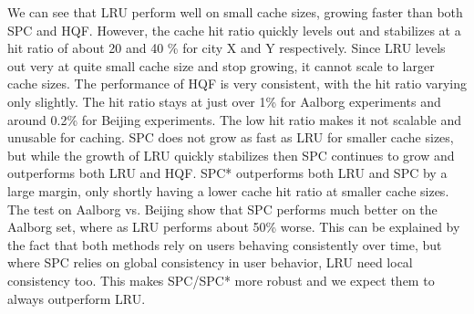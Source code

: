 
We can see that LRU perform well on small cache sizes, growing faster than both SPC and HQF. However, the cache hit ratio quickly levels out and stabilizes at a hit ratio of about 20 and 40 \% for city X and Y respectively. Since LRU levels out very at quite small cache size and stop growing, it cannot scale to larger cache sizes.
The performance of HQF is very consistent, with the hit ratio varying only slightly. The hit ratio stays at just over 1\% for Aalborg experiments and around 0.2\% for Beijing experiments. The low hit ratio makes it not scalable and unusable for \spath caching.
SPC does not grow as fast as LRU for smaller cache sizes, but while the growth of LRU quickly stabilizes then SPC continues to grow and outperforms both LRU and HQF.
SPC* outperforms both LRU and SPC by a large margin, only shortly having a lower cache hit ratio at smaller cache sizes. The test on Aalborg vs. Beijing  show that SPC performs much better on the Aalborg set, where as LRU performs about 50\% worse. This can be explained by the fact that both methods rely on users behaving consistently over time, but where SPC relies on global consistency in user behavior, LRU need local consistency too. This makes SPC/SPC* more robust and we expect them to always outperform LRU.



